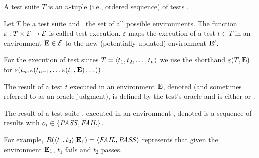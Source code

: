 
\begin{definition}
A test suite\/ $T$ is an $n$-tuple (i.e., ordered sequence) of tests
.

\end{definition}

\begin{definition}
Let\/ $T$ be a test suite and\/ \environs\ the set of all possible
environments.
The function\/ $\varepsilon: T \times \mathcal{E} \rightarrow
\mathcal{E}$ is called test
execution. $\varepsilon$ maps the execution of a test\/ $ t \in T$ 
in an environment\/ $\mathbf{E} \in \mathcal{E}$ to the new (potentially updated)
environment\/ $\mathbf{E}'$.

For the execution of test suites\/ $T =  \langle t_1, t_2, \dots, t_n \rangle $
we use the shorthand\/
$\varepsilon(T,\mathbf{E})$ for $\varepsilon(t_n,\varepsilon(t_{n-1},\dots \varepsilon(t_1,\mathbf{E}) \dots ))$.
\end{definition}

\begin{definition}
The result of a test $t$ executed in an environment\/ $\mathbf{E}$,
denoted\/  (and sometimes referred to 
as an oracle judgment), is defined by the test's oracle
and is either \pass or \fail.

The result of a test suite\/ , executed in an
environment\/ \env, denoted\/  is a
sequence of results\/  with $o_i \in \{\mathit{PASS},\mathit{FAIL}\}$.


For example, $R( \langle t_1, t_2 \rangle |\mathbf{E}_1) =  \langle \mathit{FAIL}, \mathit{PASS} \rangle $ represents that 
given the environment\/ $\mathbf{E}_1$, $t_1$ fails and\/ $t_2$ passes.
\end{definition}


%

